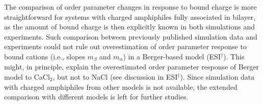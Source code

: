 \documentclass[twoside,twocolumn,9pt]{article}
\begin{document}
The comparison of order parameter changes in response to bound charge is more straightforward for
systems with charged amphiphiles fully associated in bilayer, as the amount of bound charge
is then explicitly known in both simulations and experiments. Such comparison
between previously published simulation data \cite{miettinen09} and experiments \cite{scherer89,franzin98}
could not rule out
overestimation of order parameter response to bound cations (i.e., slopes $m_\beta$ and $m_\alpha$)
in a Berger-based model (ESI$^\dag$).
This might, in principle, explain the overestimated order parameter 
response of Berger model to CaCl$_2$, but not to NaCl (see discussion in ESI$^\dag$).
Since simulation data with charged amphiphiles from other models is not available,
the extended comparison with different models is left for further studies.
\end{document}

